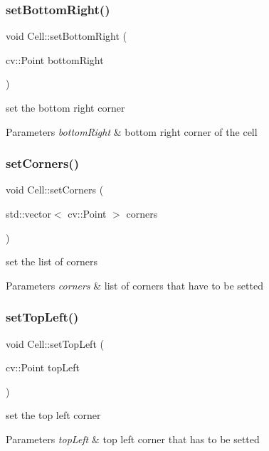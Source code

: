 \subsubsection{\texorpdfstring{set\+Bottom\+Right()}{setBottomRight()}}
{\footnotesize\ttfamily void Cell\+::set\+Bottom\+Right (\begin{DoxyParamCaption}\item[{cv\+::\+Point}]{bottom\+Right }\end{DoxyParamCaption})}

set the bottom right corner 
\begin{DoxyParams}{Parameters}
{\em bottom\+Right} & bottom right corner of the cell \\
\hline
\end{DoxyParams}
\mbox{\label{class_cell_a6d1ad0f2766cdd641ba0e65f8b3c9555}} 
\subsubsection{\texorpdfstring{set\+Corners()}{setCorners()}}
{\footnotesize\ttfamily void Cell\+::set\+Corners (\begin{DoxyParamCaption}\item[{std\+::vector$<$ cv\+::\+Point $>$}]{corners }\end{DoxyParamCaption})}

set the list of corners 
\begin{DoxyParams}{Parameters}
{\em corners} & list of corners that have to be setted \\
\hline
\end{DoxyParams}
\mbox{\label{class_cell_a9e2d13652a170ef25265a41dfe39e93f}} 
\subsubsection{\texorpdfstring{set\+Top\+Left()}{setTopLeft()}}
{\footnotesize\ttfamily void Cell\+::set\+Top\+Left (\begin{DoxyParamCaption}\item[{cv\+::\+Point}]{top\+Left }\end{DoxyParamCaption})}

set the top left corner 
\begin{DoxyParams}{Parameters}
{\em top\+Left} & top left corner that has to be setted \\
\hline
\end{DoxyParams}
\mbox{\label{class_cell_a245afe36e263e2fbf66880e4ea628f40}} 
